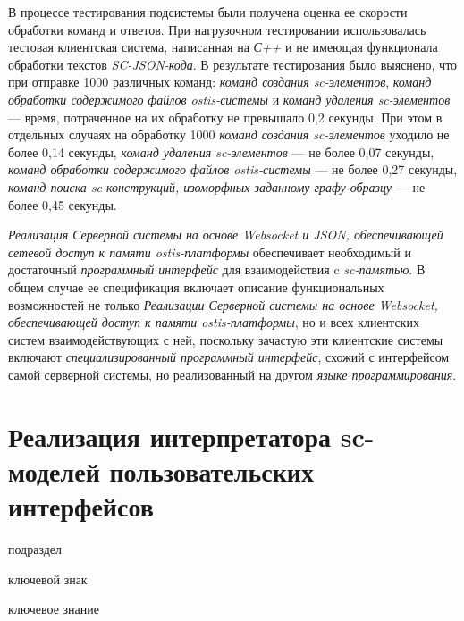 \begin{textitemize}
    \item В процессе тестирования подсистемы были получена оценка ее скорости обработки команд и ответов. При нагрузочном тестировании использовалась тестовая клиентская система, написанная на \textit{С++} и не имеющая функционала обработки текстов \textit{SC-JSON-кода}. В результате тестирования было выяснено, что при отправке 1000 различных команд: \textit{команд создания sc-элементов}, \textit{команд обработки содержимого} \textit{файлов ostis-системы} и \textit{команд удаления sc-элементов} --- время, потраченное на их обработку не превышало 0,2 секунды. При этом в отдельных случаях на обработку 1000 \textit{команд создания \textit{sc-элементов}} уходило не более 0,14 секунды, \textit{команд удаления sc-элементов} --- не более 0,07 секунды, \textit{команд обработки содержимого файлов ostis-системы} --- не более 0,27 секунды, \textit{команд поиска sc-конструкций, изоморфных заданному графу-образцу} --- не более 0,45 секунды.
\end{textitemize}

\textit{Реализация Серверной системы на основе Websocket и JSON, обеспечивающей сетевой доступ к памяти ostis-платформы} обеспечивает необходимый и достаточный \textit{программный интерфейс} для взаимодействия c \textit{sc-памятью}. В общем случае ее спецификация включает описание функциональных возможностей не только \textit{Реализации Серверной системы на основе Websocket, обеспечивающей доступ к памяти ostis-платформы}, но и всех клиентских систем взаимодействующих с ней, поскольку зачастую эти клиентские системы включают \textit{специализированный программный интерфейс}, схожий с интерфейсом самой серверной системы, но реализованный на другом \textit{языке программирования}.

\section{Реализация интерпретатора sc-моделей пользовательских интерфейсов}
\label{sec_soft_platform_sci_machine}

\begin{SCn}

\begin{scnrelfromlist}{подраздел}
\end{scnrelfromlist}

\begin{scnrelfromlist}{ключевой знак}
\end{scnrelfromlist}

\begin{scnrelfromlist}{ключевое знание}
\end{scnrelfromlist}

\end{SCn}

